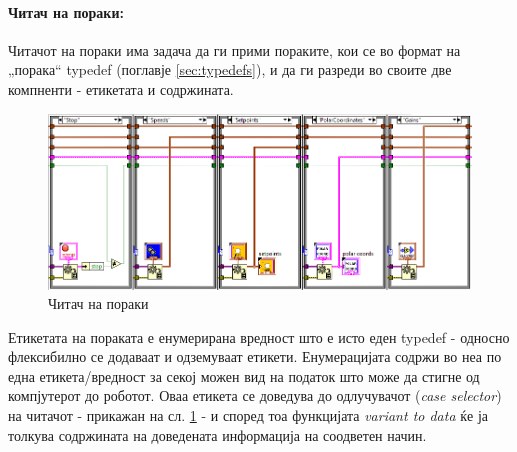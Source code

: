 \documentclass[11pt]{article}
\begin{document}
    \paragraph{Читач на пораки:\\}
      Читачот на пораки има задача да ги прими пораките, кои се во формат на „порака“ typedef (поглавје \ref{sec:typedefs}), и да ги разреди во своите две компненти - етикетата и содржината.
      \begin{figure}[H]
        \centering
        \includegraphics[width=0.85\linewidth]{./images/robot_msg.png}
        \caption{Читач на пораки}
        \label{fig:parser}
        \end{figure}
      Етикетата на пораката е енумерирана вредност што е исто еден typedef - односно флексибилно се додаваат и одземуваат етикети. Енумерацијата содржи во неа по една етикета/вредност за секој можен вид на податок што може да стигне од компјутерот до роботот. Оваа етикета се доведува до одлучувачот (\textit{case selector}) на читачот - прикажан на сл. \ref{fig:parser} - и според тоа функцијата \textit{variant to data} ќе ја толкува содржината на доведената информација на соодветен начин.
\end{document}
